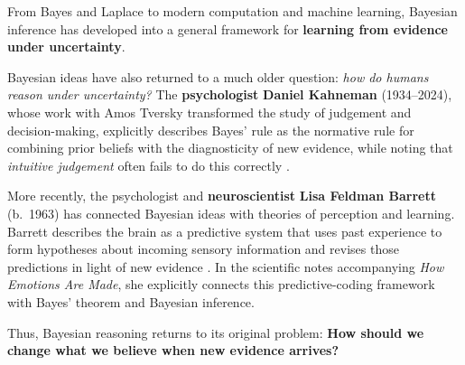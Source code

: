 From Bayes and Laplace to modern computation and machine learning, Bayesian inference has developed into a general framework for \textbf{learning from evidence under uncertainty}.

Bayesian ideas have also returned to a much older question: \emph{how do humans reason under uncertainty?} The \textbf{psychologist} \textbf{Daniel Kahneman} (1934--2024), whose work with Amos Tversky transformed the study of judgement and decision-making, explicitly describes Bayes' rule as the normative rule for combining prior beliefs with the diagnosticity of new evidence, while noting that \textit{intuitive judgement} often fails to do this correctly \cite[p.~154]{kahneman2011}.

More recently, the psychologist and \textbf{neuroscientist} \textbf{Lisa Feldman Barrett} (b.~1963) has connected Bayesian ideas with theories of perception and learning. Barrett describes the brain as a predictive system that uses past experience to form hypotheses about incoming sensory information and revises those predictions in light of new evidence \cite{barrett2017}. In the scientific notes accompanying \emph{How Emotions Are Made}, she explicitly connects this predictive-coding framework with Bayes' theorem and Bayesian inference. 

Thus, Bayesian reasoning returns to its original problem: \textbf{How should we change what we believe when new evidence arrives?}

